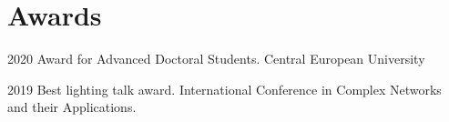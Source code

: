 \documentclass{academiccv}
\begin{document}
\section*{Awards}
\begin{tablist}
	\item[2020] \tab Award for Advanced Doctoral Students. Central European University 
	\item[2019] \tab Best lighting talk award. International Conference in Complex Networks and their Applications. 
\end{tablist}



\end{document}
